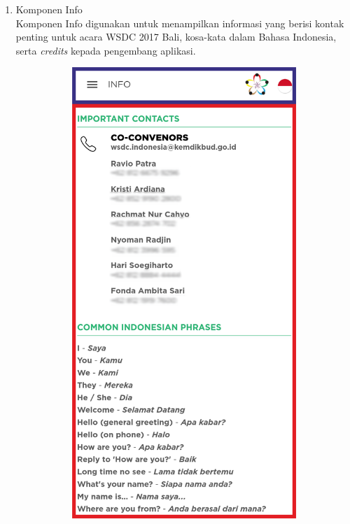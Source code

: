 \begin{enumerate}
	\item Komponen Info \\
	Komponen Info digunakan untuk menampilkan informasi yang berisi kontak penting untuk acara WSDC 2017 Bali, kosa-kata dalam Bahasa Indonesia, serta \textit{credits} kepada pengembang aplikasi.
	\begin{figure}[H]
    	\centering
     	\begin{subfigure}[b]{0.43\textwidth}
        	\centering
         	\includegraphics[scale=0.465]{Gambar/InfoPageWireframe.png}

\end{subfigure}
\end{figure}
\end{enumerate}
